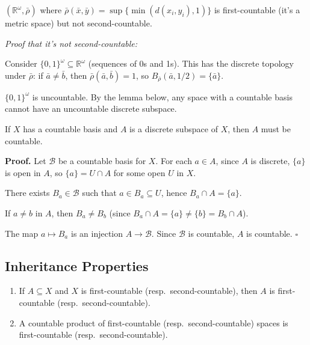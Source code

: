 \documentclass[11pt]{report}
\renewenvironment{proof}[1][Proof]{\noindent\textbf{#1.} }{\hfill$\square$\par\vspace{5pt}}
\begin{document}
\begin{exbox}
$(\mathbb{R}^\omega, \bar{\rho})$ where $\bar{\rho}(\bar{x}, \bar{y}) = \sup\{\min(d(x_i, y_i), 1)\}$ is first-countable (it's a metric space) but not second-countable.

\textit{Proof that it's not second-countable:}

Consider $\{0, 1\}^\omega \subseteq \mathbb{R}^\omega$ (sequences of 0s and 1s). This has the discrete topology under $\bar{\rho}$: if $\bar{a} \neq \bar{b}$, then $\bar{\rho}(\bar{a}, \bar{b}) = 1$, so $B_{\bar{\rho}}(\bar{a}, 1/2) = \{\bar{a}\}$.

$\{0, 1\}^\omega$ is uncountable. By the lemma below, any space with a countable basis cannot have an uncountable discrete subspace.
\end{exbox}

\begin{lembox}
If $X$ has a countable basis and $A$ is a discrete subspace of $X$, then $A$ must be countable.
\end{lembox}

\begin{proof}
Let $\mathcal{B}$ be a countable basis for $X$. For each $a \in A$, since $A$ is discrete, $\{a\}$ is open in $A$, so $\{a\} = U \cap A$ for some open $U$ in $X$.

There exists $B_a \in \mathcal{B}$ such that $a \in B_a \subseteq U$, hence $B_a \cap A = \{a\}$.

If $a \neq b$ in $A$, then $B_a \neq B_b$ (since $B_a \cap A = \{a\} \neq \{b\} = B_b \cap A$).

The map $a \mapsto B_a$ is an injection $A \to \mathcal{B}$. Since $\mathcal{B}$ is countable, $A$ is countable.
\end{proof}

\subsection{Inheritance Properties}

\begin{thmbox}
\begin{enumerate}
    \item If $A \subseteq X$ and $X$ is first-countable (resp.\ second-countable), then $A$ is first-countable (resp.\ second-countable).
    \item A countable product of first-countable (resp.\ second-countable) spaces is first-countable (resp.\ second-countable).
\end{enumerate}
\end{thmbox}
\end{document}
